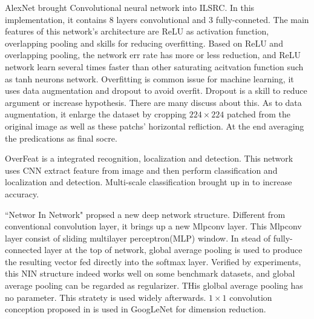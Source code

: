 \documentclass[10pt,twocolumn,letterpaper]{article}
\begin{document}
\par
AlexNet\cite{} brought Convolutional neural network into ILSRC. In this implementation, it contains 8 layers  convolutional and 3 fully-conneted. The main features of this network's architecture are ReLU\cite{relu} as activation function, overlapping pooling and skills for reducing overfitting. Based on ReLU and overlapping pooling, the network err rate has more or less reduction, and ReLU network learn several times faster than other saturating acitvation function such as tanh neurons network. Overfitting is common issue for machine learning, it uses data augmentation and dropout to avoid overfit. Dropout is a skill to reduce argument or increase hypothesis. There are many discuss about this. As to data augmentation, it enlarge the dataset by cropping $224\times 224$ patched from the original image as well as these patchs' horizontal refliction. At the end averaging the predications as final socre.
\par
OverFeat\cite{} is a integrated recognition, localization and detection. This network uses CNN extract feature from image and then perform classification and localization and detection. Multi-scale classification brought up in \cite{} to increase accuracy.
\par
``Networ In Network"\cite{} propsed a new deep network structure. Different from conventional convolution layer, it brings up a new Mlpconv layer. This Mlpconv layer consist of sliding multilayer perceptron(MLP) window. In stead of fully-connected layer at the top of network, global average pooling is used to produce the resulting vector fed directly into the softmax layer. Verified by experiments, this NIN structure indeed works well on some benchmark datasets, and global average pooling can be regarded as regularizer. THis glolbal average pooling has no parameter. This stratety is used widely afterwards. $1\times 1$ convolution conception proposed in \cite{} is used in GoogLeNet for dimension reduction.
\end{document}
